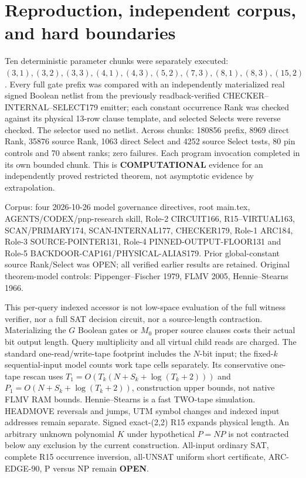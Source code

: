 \documentclass[11pt]{article}
\begin{document}
\section{Reproduction, independent corpus, and hard boundaries}
Ten deterministic parameter chunks were separately
executed: \((3,1),(3,2),(3,3),(4,1),(4,3),
(5,2),(7,3),(8,1),(8,3),(15,2)\).
Every full gate prefix was compared with an independently
materialized real signed Boolean netlist from the previously
readback-verified CHECKER--INTERNAL--SELECT179 emitter;
each constant occurrence Rank was checked against its
physical 13-row clause template, and selected Selects
were reverse checked. The selector used no netlist.
Across chunks: 180856 prefix, 8969 direct Rank,
35876 source Rank, 1063 direct Select and
4252 source Select tests, 80 pin controls and
70 absent ranks; zero failures. Each program
invocation completed in its own bounded chunk.
This is \textbf{COMPUTATIONAL} evidence for an
independently proved restricted theorem, not
asymptotic evidence by extrapolation.

Corpus: four 2026-10-26 model governance directives,
root main.tex, AGENTS/CODEX/pnp-research skill,
Role-2 CIRCUIT166, R15--VIRTUAL163,
SCAN/PRIMARY174, SCAN-INTERNAL177, CHECKER179,
Role-1 ARC184, Role-3 SOURCE-POINTER131,
Role-4 PINNED-OUTPUT-FLOOR131 and Role-5
BACKDOOR-CAP161/PHYSICAL-ALIAS179. Prior
global-constant source Rank/Select was OPEN;
all verified earlier results are retained.
Original theorem-model controls: Pippenger--Fischer
1979, FLMV 2005, Hennie--Stearns 1966.

This per-query indexed accessor is not low-space
evaluation of the full witness verifier, nor a
full SAT decision circuit, nor a source-length
contraction. Materializing the \(G\) Boolean
gates or \(M_0\) proper source clauses costs
their actual bit output length. Query multiplicity
and all virtual child reads are charged.
The standard one-read/write-tape footprint includes
the \(N\)-bit input; the fixed-\(k\) sequential-input
model counts work tape cells separately. Its
conservative one-tape rescan uses
\(T_1=O(T_k(N+S_k+\log(T_k+2)))\) and
\(P_1=O(N+S_k+\log(T_k+2))\), construction
upper bounds, not native FLMV RAM bounds.
Hennie--Stearns is a fast TWO-tape simulation.
HEADMOVE reversals and jumps, UTM symbol changes
and indexed input addresses remain separate.
Signed exact-(2,2) R15 expands physical length.
An arbitrary unknown polynomial \(K\)
under hypothetical \(P=NP\) is not contracted
below any exclusion by the current construction.
All-input ordinary SAT, complete R15 occurrence
inversion, all-UNSAT uniform short certificate,
ARC-EDGE-90, P versus NP remain \textbf{OPEN}.
\end{document}
